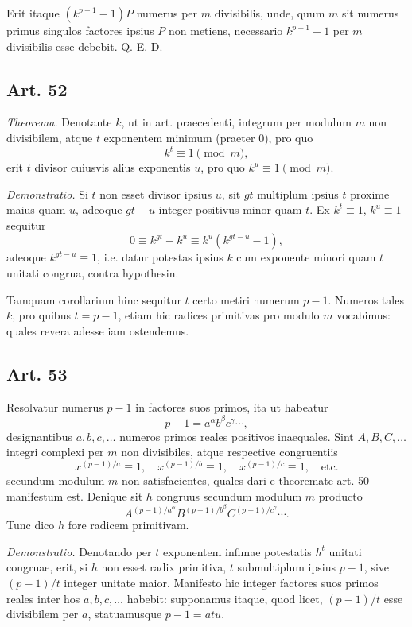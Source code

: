 \documentclass[12pt]{article}
\newcommand{\art}[1]{\subsection*{Art. #1}}
\begin{document}
Erit itaque $(k^{p-1}-1)P$ numerus per $m$ divisibilis, unde, quum $m$ sit numerus primus singulos factores ipsius $P$ non metiens, necessario $k^{p-1}-1$ per $m$ divisibilis esse debebit. Q. E. D.

\art{52}
\emph{Theorema.} Denotante $k$, ut in art. praecedenti, integrum per modulum $m$ non divisibilem, atque $t$ exponentem minimum (praeter $0$), pro quo
\[
k^t\equiv1\pmod m,
\]
erit $t$ divisor cuiusvis alius exponentis $u$, pro quo $k^u\equiv1\pmod m$.

\emph{Demonstratio.} Si $t$ non esset divisor ipsius $u$, sit $gt$ multiplum ipsius $t$ proxime maius quam $u$, adeoque $gt-u$ integer positivus minor quam $t$. Ex $k^t\equiv1$, $k^u\equiv1$ sequitur
\[
0\equiv k^{gt}-k^u\equiv k^u(k^{gt-u}-1),
\]
adeoque $k^{gt-u}\equiv1$, i.e. datur potestas ipsius $k$ cum exponente minori quam $t$ unitati congrua, contra hypothesin.

Tamquam corollarium hinc sequitur $t$ certo metiri numerum $p-1$. Numeros tales $k$, pro quibus $t=p-1$, etiam hic radices primitivas pro modulo $m$ vocabimus: quales revera adesse iam ostendemus.

\art{53}
Resolvatur numerus $p-1$ in factores suos primos, ita ut habeatur
\[
p-1=a^\alpha b^\beta c^\gamma\cdots,
\]
designantibus $a,b,c,\ldots$ numeros primos reales positivos inaequales. Sint $A,B,C,\ldots$ integri complexi per $m$ non divisibiles, atque respective congruentiis
\[
x^{(p-1)/a}\equiv1,
\quad
x^{(p-1)/b}\equiv1,
\quad
x^{(p-1)/c}\equiv1,
\quad\text{etc.}
\]
secundum modulum $m$ non satisfacientes, quales dari e theoremate art. 50 manifestum est. Denique sit $h$ congruus secundum modulum $m$ producto
\[
A^{(p-1)/a^\alpha}B^{(p-1)/b^\beta}C^{(p-1)/c^\gamma}\cdots.
\]
Tunc dico $h$ fore radicem primitivam.

\emph{Demonstratio.} Denotando per $t$ exponentem infimae potestatis $h^t$ unitati congruae, erit, si $h$ non esset radix primitiva, $t$ submultiplum ipsius $p-1$, sive $(p-1)/t$ integer unitate maior. Manifesto hic integer factores suos primos reales inter hos $a,b,c,\ldots$ habebit: supponamus itaque, quod licet, $(p-1)/t$ esse divisibilem per $a$, statuamusque $p-1=atu$.
\end{document}
